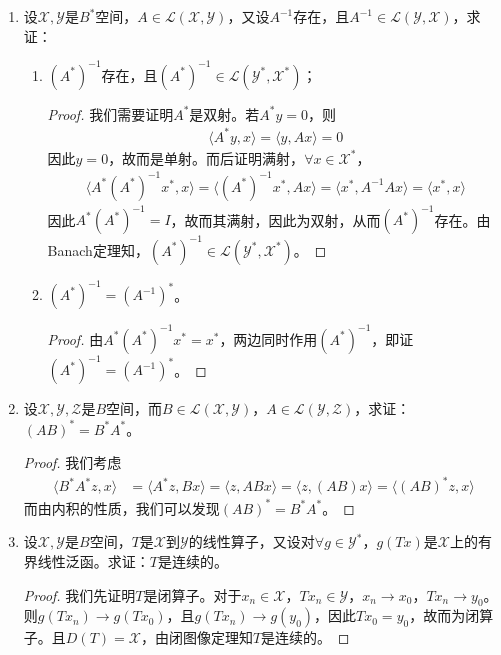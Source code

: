 \begin{enumerate}[leftmargin=2cm, label=\arabic*]
		\item 设$\mathscr{X},\mathscr{Y}$是$B^*$空间，$A\in\mathscr{L}(\mathscr{X},\mathscr{Y})$，又设$A^{-1}$存在，且$A^{-1}\in\mathscr{L}(\mathscr{Y},\mathscr{X})$，求证：
		\begin{enumerate}[leftmargin=1cm, label=(\arabic*)]
			\item $(A^*)^{-1}$存在，且$(A^*)^{-1}\in\mathscr{L}(\mathscr{Y}^*,\mathscr{X}^*)$；
			\begin{proof}
				我们需要证明$A^*$是双射。若$A^*y = 0$，则
				\begin{align*}
					\langle A^*y, x\rangle = \langle y, Ax\rangle = 0
				\end{align*}
				因此$y = 0$，故而是单射。而后证明满射，$\forall x\in\mathscr{X}^*$，
				\begin{align*}
					\langle A^*(A^*)^{-1}x^*, x \rangle = \langle (A^*)^{-1}x^*, Ax\rangle = \langle x^*, A^{-1}Ax\rangle = \langle x^*, x\rangle
				\end{align*}
				因此$A^*(A^*)^{-1} = I$，故而其满射，因此为双射，从而$(A^*)^{-1}$存在。由Banach定理知，$(A^*)^{-1}\in\mathscr{L}(\mathscr{Y}^*,\mathscr{X}^*)$。
			\end{proof}
			
			\item $(A^*)^{-1} = (A^{-1})^*$。
			\begin{proof}
				由$A^*(A^*)^{-1}x^* = x^*$，两边同时作用$(A^*)^{-1}$，即证$(A^*)^{-1} = (A^{-1})^*$。
			\end{proof}
		\end{enumerate}
		
		\item 设$\mathscr{X},\mathscr{Y},\mathscr{Z}$是$B$空间，而$B\in\mathscr{L}(\mathscr{X},\mathscr{Y})$，$A\in\mathscr{L}(\mathscr{Y},\mathscr{Z})$，求证：$(AB)^* = B^*A^*$。
		\begin{proof}
			我们考虑
			\begin{align*}
				\langle B^*A^*z, x\rangle &= \langle A^*z, Bx\rangle = \langle z, ABx\rangle = \langle z, (AB)x\rangle = \langle (AB)^*z, x\rangle 
			\end{align*}
			而由内积的性质，我们可以发现$(AB)^* = B^*A^*$。
		\end{proof} 
		
		\item 设$\mathscr{X},\mathscr{Y}$是$B$空间，$T$是$\mathscr{X}$到$\mathscr{Y}$的线性算子，又设对$\forall g\in\mathscr{Y}^*$，$g(Tx)$是$\mathscr{X}$上的有界线性泛函。求证：$T$是连续的。
		\begin{proof}
			我们先证明$T$是闭算子。对于$x_n\in\mathscr{X}$，$Tx_n\in\mathscr{Y}$，$x_n\to x_0$，$Tx_n\to y_0$。则$g(Tx_n) \to g(Tx_0)$，且$g(Tx_n) \to g(y_0)$，因此$Tx_0 = y_0$，故而为闭算子。且$D(T) = \mathscr{X}$，由闭图像定理知$T$是连续的。
		\end{proof}
		

\end{enumerate}
